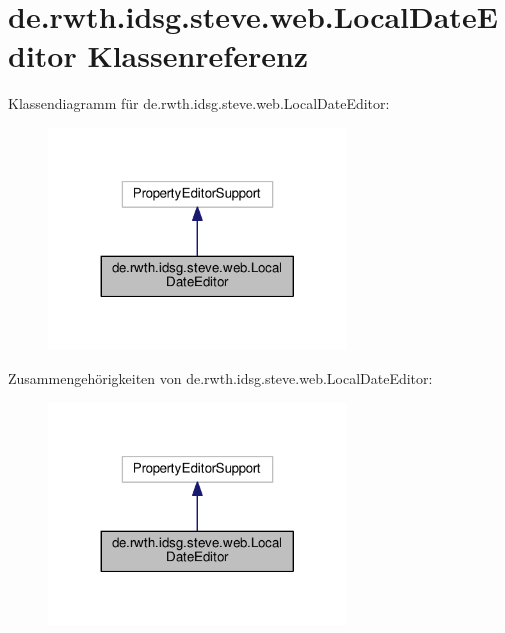 \hypertarget{classde_1_1rwth_1_1idsg_1_1steve_1_1web_1_1_local_date_editor}{\section{de.\+rwth.\+idsg.\+steve.\+web.\+Local\+Date\+Editor Klassenreferenz}
\label{classde_1_1rwth_1_1idsg_1_1steve_1_1web_1_1_local_date_editor}
}


Klassendiagramm für de.\+rwth.\+idsg.\+steve.\+web.\+Local\+Date\+Editor\+:\nopagebreak
\begin{figure}[H]
\begin{center}
\leavevmode
\includegraphics[width=224pt]{classde_1_1rwth_1_1idsg_1_1steve_1_1web_1_1_local_date_editor__inherit__graph}
\end{center}
\end{figure}


Zusammengehörigkeiten von de.\+rwth.\+idsg.\+steve.\+web.\+Local\+Date\+Editor\+:\nopagebreak
\begin{figure}[H]
\begin{center}
\leavevmode
\includegraphics[width=224pt]{classde_1_1rwth_1_1idsg_1_1steve_1_1web_1_1_local_date_editor__coll__graph}
\end{center}
\end{figure}
